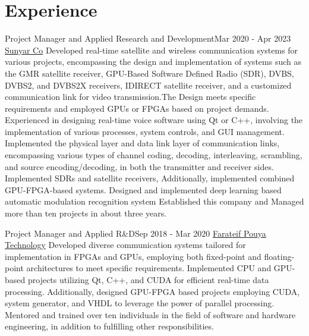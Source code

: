 \section{Experience}
  \resumeSubHeadingListStart

  \resumeSubheading
  {Project Manager and Applied Research and Development}{Mar 2020 - Apr 2023}
  {\href{https://www.linkedin.com/company/sunyar/}{Sunyar Co}}{}
    \resumeItemListStart
      {Developed real-time satellite and wireless communication systems for various projects, encompassing the design and implementation of systems such as the GMR satellite receiver, GPU-Based Software Defined Radio (SDR), DVBS, DVBS2, and DVBS2X receivers, IDIRECT satellite receiver, and a customized communication link for video transmission.The Design meets specific requirements and employed GPUs or FPGAs based on project demands.}
      {Experienced in designing real-time voice software using Qt or C++, involving the implementation of various processes, system controls, and GUI management.}   
      {Implemented the physical layer and data link layer of communication links, encompassing various types of channel coding, decoding, interleaving, scrambling, and source encoding/decoding, in both the transmitter and receiver sides.}              
      {Implemented SDRs and satellite receivers, Additionally, implemented combined GPU-FPGA-based systems.} 
      {Designed and implemented deep learning based automatic modulation recognition system} 
      {Established this company and Managed more than ten projects in about three years.} 
      \resumeItemListEnd

    \resumeSubheading
      {Project Manager and Applied R\&D}{Sep 2018 - Mar 2020}
      {\href{https://iranlabexpo.ir/en/company/2983/Farateif-Pouya-Technology}{Farateif Pouya Technology}}{}
      \resumeItemListStart
          {Developed diverse communication systems tailored for implementation in FPGAs and GPUs, employing both fixed-point and floating-point architectures to meet specific requirements.}
          {Implemented CPU and GPU-based projects utilizing Qt, C++, and CUDA for efficient real-time data processing. Additionally, designed GPU-FPGA based projects employing CUDA, system generator, and VHDL to leverage the power of parallel processing.}
          {Mentored and trained over ten individuals in the field of software and hardware engineering, in addition to fulfilling other responsibilities.}
      \resumeItemListEnd

